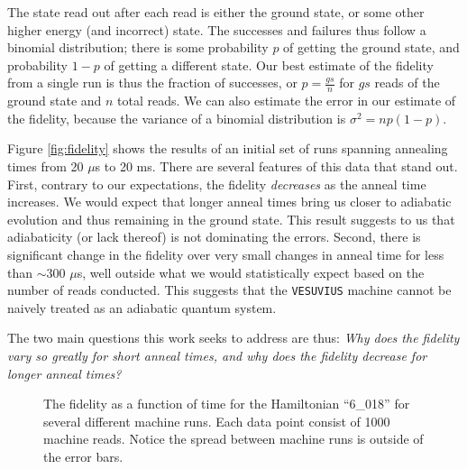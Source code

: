 The state read out after each read is either the ground state, or some other higher energy (and incorrect) state.  The successes and failures thus follow a binomial distribution; there is some probability $p$ of getting the ground state, and probability $1-p$ of getting a different state.
Our best estimate of the fidelity from a single run is thus the fraction of successes, or $p = \frac{gs}{n}$ for $gs$ reads of the ground state and $n$ total reads.  We can also estimate the error in our estimate of the fidelity, because the variance of a binomial distribution is $\sigma^2 = np(1-p)$.

Figure \ref{fig:fidelity} shows the results of an initial set of runs spanning annealing times from 20 $\mu$s to 20 ms.  There are several features of this data that stand out.  First, contrary to our expectations, the fidelity \emph{decreases} as the anneal time increases.  We would expect that longer anneal times bring us closer to adiabatic evolution and thus remaining in the ground state.  This result suggests to us that adiabaticity (or lack thereof) is not dominating the errors.  Second, there is significant change in the fidelity over very small changes in anneal time for less than $\sim 300$ $\mu$s, well outside what we would statistically expect based on the number of reads conducted.  This suggests that the \texttt{VESUVIUS} machine cannot be naively treated as an adiabatic quantum system.

The two main questions this work seeks to address are thus: \emph{Why does the fidelity vary so greatly for short anneal times, and why does the fidelity decrease for longer anneal times?}

\begin{figure}
	\caption[Short Time Fidelities]{The fidelity as a function of time for the Hamiltonian ``6\_018'' for several different machine runs.  Each data point consist of 1000 machine reads.  Notice the spread between machine runs is outside of the error bars.}
	\label{fig:short_fidelity}
\end{figure}

